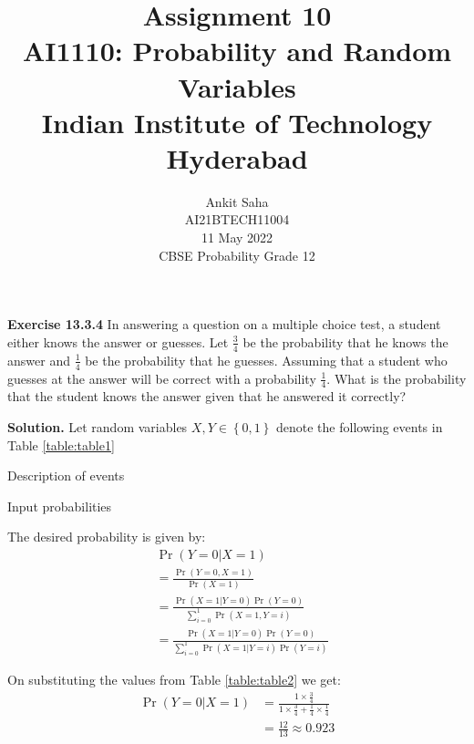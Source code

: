 \documentclass[journal,12pt,twocolumn]{IEEEtran}
\title{Assignment 10 \\ \Large AI1110: Probability and Random Variables \\ \large Indian Institute of Technology Hyderabad}
\author{Ankit Saha \\ \normalsize AI21BTECH11004 \\ \vspace*{20pt} \normalsize  11 May 2022 \\ \vspace*{20pt} \Large CBSE Probability Grade 12}
\providecommand{\pr}[1]{\ensuremath{\Pr\left(#1\right)}}
\providecommand{\cbrak}[1]{\ensuremath{\left\{#1\right\}}}
\begin{document}
	\maketitle
	
	\textbf{Exercise 13.3.4} 
	In answering a question on a multiple choice test, a student either knows the answer or guesses. Let $\frac34$ be the probability that he knows the answer and $\frac14$ be the probability that he guesses. Assuming that a student who guesses at the answer will be correct with a probability $\frac14$. What is the probability that the student knows the answer given that he answered it correctly?
	
	\textbf{Solution.}
	Let random variables $X, Y \in \cbrak{0,1}$ denote the following events in Table \eqref{table:table1}
	\begin{table}[ht!]
		\centering
		
		\caption{Description of events}
		\label{table:table1}	
	\end{table}
	\begin{table}[ht!]
		\centering
		
		\caption{Input probabilities}
		\label{table:table2}	
	\end{table}	
	
	The desired probability is given by:
	\begin{align}
		&\pr{Y = 0|X = 1} \\ 
		&= \frac{\pr{Y = 0,X = 1}}{\pr{X = 1}} \\
		&= \frac{\pr{X = 1|Y = 0}\pr{Y = 0}}{\sum_{i=0}^1 \pr{X = 1,Y = i}} \\
		&= \frac{\pr{X = 1|Y = 0}\pr{Y = 0}}{\sum_{i=0}^1 \pr{X = 1|Y = i}\pr{Y = i}}
	\end{align}
	
	On substituting the values from Table \eqref{table:table2} we get:
	\begin{align}
		\pr{Y = 0|X = 1} &= \frac{1 \times \frac34}{1 \times \frac34 + \frac14 \times \frac14} \\
		&= \frac{12}{13} \approx 0.923
	\end{align}
	
\end{document}
